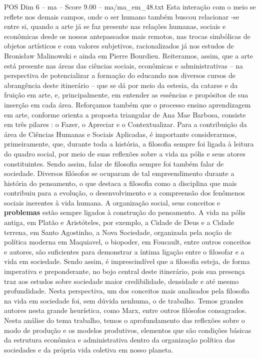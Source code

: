 \begin{textsample}{POS Dim 6 – ma – Score 9.00 – ma/ma\_em\_48.txt}
Esta interação com o meio se reflete nos demais campos, onde o ser humano também buscou relacionar -se entre si, quando a arte já se faz presente nas relações humanas, sociais e econômicas desde os nossos antepassados mais remotos, nas trocas simbólicas de objetos artísticos e com valores subjetivos, racionalizados já nos estudos de Bronisław Malinowski e ainda em Pierre Bourdieu.
Reiteramos, assim, que a arte está presente nas áreas das ciências sociais, econômicas e administrativas – na perspectiva de potencializar a formação do educando nos diversos cursos de abrangência deste itinerário – que se dá por meio da estesia, da catarse e da fruição em arte, e, principalmente, em entender as essências e propósitos de sua inserção em cada área.
Reforçamos também que o processo ensino aprendizagem em arte, conforme orienta a proposta triangular de Ana Mae Barbosa, consiste em três pilares : o Fazer, o Apreciar e o Contextualizar.
Para a contribuição da área de Ciências Humanas e Sociais Aplicadas, é importante considerarmos, primeiramente, que, durante toda a história, a filosofia sempre foi ligada à leitura do quadro social, por meio de suas reflexões sobre a vida na pólis e seus atores constituintes.
Sendo assim, falar de filosofia sempre foi também falar de sociedade.
Diversos filósofos se ocuparam de tal empreendimento durante a história do pensamento, o que destaca a filosofia como a disciplina que mais contribuiu para a evolução, o desenvolvimento e a compreensão dos fenômenos sociais inerentes à vida humana.
A organização social, seus conceitos e \textbf{problemas} estão sempre ligados à construção do pensamento.
A vida na pólis antiga, em Platão e Aristóteles, por exemplo, a Cidade de Deus e a Cidade terrena, em Santo Agostinho, a Nova Sociedade, organizada pela noção de política moderna em Maquiavel, o biopoder, em Foucault, entre outros conceitos e autores, são suficientes para demonstrar a íntima ligação entre o filosofar e a vida em sociedade.
Sendo assim, é imprescindível que a filosofia esteja, de forma imperativa e preponderante, no bojo central deste itinerário, pois sua presença traz aos estudos sobre sociedade maior credibilidade, densidade e até mesmo profundidade.
Nesta perspectiva, um dos conceitos mais analisados pela filosofia na vida em sociedade foi, sem dúvida nenhuma, o de trabalho.
Temos grandes autores nesta grande heurística, como Marx, entre outros filósofos consagrados.
Nesta análise do tema trabalho, temos o aprofundamento das reflexões sobre o modo de produção e os modelos produtivos, elementos que são condições básicas da estrutura econômica e administrativa dentro da organização política das sociedades e da própria vida coletiva em nosso planeta.

\end{textsample}
